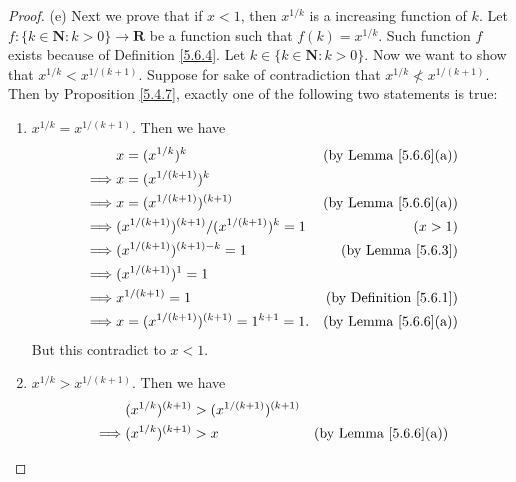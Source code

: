 \begin{proof}{(e)}
    Next we prove that if \(x < 1\), then \(x^{1 / k}\) is a increasing function of \(k\).
    Let \(f : \{k \in \mathbf{N} : k > 0\} \to \mathbf{R}\) be a function such that \(f(k) = x^{1 / k}\).
    Such function \(f\) exists because of Definition \ref{5.6.4}.
    Let \(k \in \{k \in \mathbf{N} : k > 0\}\).
    Now we want to show that \(x^{1 / k} < x^{1 / (k + 1)}\).
    Suppose for sake of contradiction that \(x^{1 / k} \not< x^{1 / (k + 1)}\).
    Then by Proposition \ref{5.4.7}, exactly one of the following two statements is true:
    \begin{enumerate}[label=(\Roman*)]
        \item \(x^{1 / k} = x^{1 / (k + 1)}\).
              Then we have
              \begin{align*}
                           & x = (x^{1 / k})^k                                     & \text{(by Lemma \ref{5.6.6}(a))}   \\
                  \implies & x = (x^{1 / (k + 1)})^k                                                                    \\
                  \implies & x = (x^{1 / (k + 1)})^{(k + 1)}                       & \text{(by Lemma \ref{5.6.6}(a))}   \\
                  \implies & (x^{1 / (k + 1)})^{(k + 1)} / (x^{1 / (k + 1)})^k = 1 & (x > 1)                            \\
                  \implies & (x^{1 / (k + 1)})^{(k + 1) - k} = 1                   & \text{(by Lemma \ref{5.6.3})}      \\
                  \implies & (x^{1 / (k + 1)})^1 = 1                                                                    \\
                  \implies & x^{1 / (k + 1)} = 1                                   & \text{(by Definition \ref{5.6.1})} \\
                  \implies & x = (x^{1 / (k + 1)})^{(k + 1)} = 1^{k + 1} = 1.      & \text{(by Lemma \ref{5.6.6}(a))}
              \end{align*}
              But this contradict to \(x < 1\).
        \item \(x^{1 / k} > x^{1 / (k + 1)}\).
              Then we have
              \begin{align*}
                           & (x^{1 / k})^{(k + 1)} > (x^{1 / (k + 1)})^{(k + 1)}                                       \\
                  \implies & (x^{1 / k})^{(k + 1)} > x                           & \text{(by Lemma \ref{5.6.6}(a))}    \\

\end{align*}
\end{enumerate}
\end{proof}
